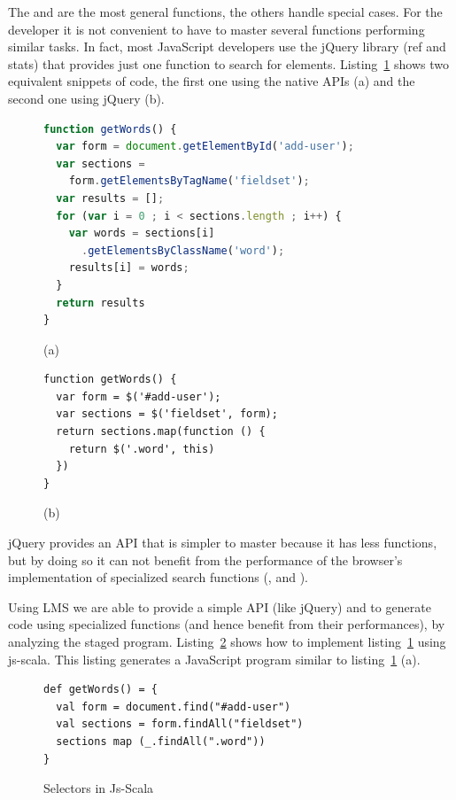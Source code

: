 \documentclass[preprint]{sigplanconf}
\begin{document}
The  and  are the most general functions, the others handle special
cases. For the developer it is not convenient to have to master several functions performing similar tasks. In fact,
most JavaScript developers use the jQuery library (ref and stats) that provides just one function to search for
elements. Listing~\ref{jquery-vanilla-api} shows two equivalent snippets of code, the first one using the native
APIs (a) and the second one using jQuery (b).

\begin{figure}
\begin{lstlisting}[language=JavaScript]
function getWords() {
  var form = document.getElementById('add-user');
  var sections =
    form.getElementsByTagName('fieldset');
  var results = [];
  for (var i = 0 ; i < sections.length ; i++) {
    var words = sections[i]
      .getElementsByClassName('word');
    results[i] = words;
  }
  return results
}
\end{lstlisting}
\caption{(a)}
\begin{lstlisting}
function getWords() {
  var form = $('#add-user');
  var sections = $('fieldset', form);
  return sections.map(function () {
    return $('.word', this)
  })
}
\end{lstlisting}
\caption{(b)}
\label{jquery-vanilla-api}
\end{figure}

jQuery provides an API that is simpler to master because it has less functions, but by doing so it can not benefit
from the performance of the browser’s implementation of specialized search functions (,
 and ).

Using LMS we are able to provide a simple API (like jQuery) and to generate code using specialized functions (and
hence benefit from their performances), by analyzing the staged program. Listing~\ref{js-scala-selectors} shows how
to implement listing~\ref{jquery-vanilla-api} using js-scala. This listing generates a JavaScript program similar to
listing~\ref{jquery-vanilla-api} (a).

\begin{figure}
\label{js-scala-selectors}
\begin{lstlisting}
def getWords() = {
  val form = document.find("#add-user")
  val sections = form.findAll("fieldset")
  sections map (_.findAll(".word"))
}
\end{lstlisting}
\caption{Selectors in Js-Scala}
\end{figure}
\end{document}
